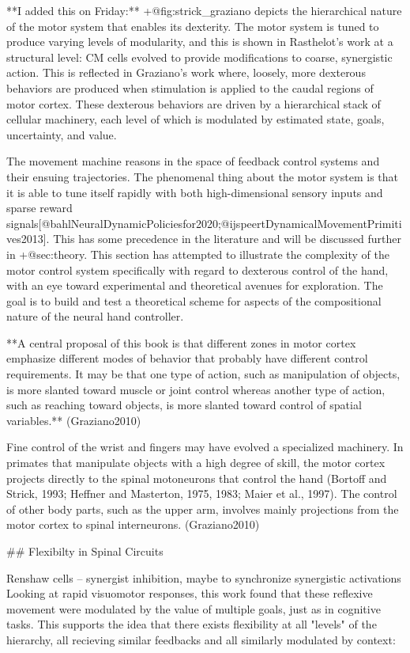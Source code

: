 \documentclass[../main.tex]{subfiles}
\begin{document}
{{ **I added this on Friday:** {+@fig:strick_graziano} depicts the hierarchical nature of the motor system that enables its dexterity. The motor system is tuned to produce varying levels of modularity, and this is shown in Rasthelot's work at a structural level: CM cells evolved to provide modifications to coarse, synergistic action. This is reflected in Graziano's work where, loosely, more dexterous behaviors are produced when stimulation is applied to the caudal regions of motor cortex. These dexterous behaviors are driven by a hierarchical stack of cellular machinery, each level of which is modulated by estimated state, goals, uncertainty, and value. 

 The movement machine reasons in the space of feedback control systems and their ensuing trajectories. The phenomenal thing about the motor system is that it is able to tune itself rapidly with both high-dimensional sensory inputs and sparse reward signals[@bahlNeuralDynamicPoliciesfor2020;@ijspeertDynamicalMovementPrimitives2013]. This has some precedence in the literature and will be discussed further in {+@sec:theory}. This section has attempted to illustrate the complexity of the motor control system specifically with regard to dexterous control of the hand, with an eye toward experimental and theoretical avenues for exploration. The goal is to build and test a theoretical scheme for aspects of the compositional nature of the neural hand controller. 

 **A central proposal of this book is that different zones in motor cortex emphasize different modes of behavior that probably have different control requirements. It may be that one type of action, such as manipulation of objects, is more slanted toward muscle or joint control whereas another type of action, such as reaching toward objects, is more slanted toward control of spatial variables.** (Graziano2010) 

 Fine control of the wrist and fingers may have evolved a specialized machinery. In primates that manipulate objects with a high degree of skill, the motor cortex projects directly to the spinal motoneurons that control the hand (Bortoff and Strick, 1993; Heffner and Masterton, 1975, 1983; Maier et al., 1997). The control of other body parts, such as the upper arm, involves mainly projections from the motor cortex to spinal interneurons. (Graziano2010) 

 ## Flexibilty in Spinal Circuits 

 Renshaw cells -- synergist inhibition, maybe to synchronize synergistic activations 
Looking at rapid visuomotor responses, this work found that these reflexive movement were modulated by the value of multiple goals, just as in cognitive tasks. This supports the idea that there exists flexibility at all "levels" of the hierarchy, all recieving similar feedbacks and all similarly modulated by context:

}}
\end{document}
